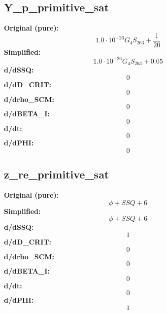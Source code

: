 \subsection{Y_p_primitive_sat}
\textbf{Original (pure):}
\begin{equation}
1.0 \cdot 10^{-26} G_{4} S_{26 3} + \frac{1}{20}
\end{equation}
\textbf{Simplified:}
\begin{equation}
1.0 \cdot 10^{-26} G_{4} S_{26 3} + 0.05
\end{equation}
\textbf{d/dSSQ:}
\begin{equation}
0
\end{equation}
\textbf{d/dD_CRIT:}
\begin{equation}
0
\end{equation}
\textbf{d/drho_SCM:}
\begin{equation}
0
\end{equation}
\textbf{d/dBETA_I:}
\begin{equation}
0
\end{equation}
\textbf{d/dt:}
\begin{equation}
0
\end{equation}
\textbf{d/dPHI:}
\begin{equation}
0
\end{equation}

\subsection{z_re_primitive_sat}
\textbf{Original (pure):}
\begin{equation}
\phi + SSQ + 6
\end{equation}
\textbf{Simplified:}
\begin{equation}
\phi + SSQ + 6
\end{equation}
\textbf{d/dSSQ:}
\begin{equation}
1
\end{equation}
\textbf{d/dD_CRIT:}
\begin{equation}
0
\end{equation}
\textbf{d/drho_SCM:}
\begin{equation}
0
\end{equation}
\textbf{d/dBETA_I:}
\begin{equation}
0
\end{equation}
\textbf{d/dt:}
\begin{equation}
0
\end{equation}
\textbf{d/dPHI:}
\begin{equation}
1
\end{equation}

